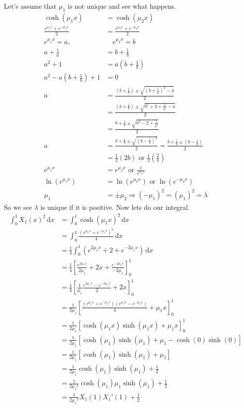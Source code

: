 \documentclass{article}
\begin{document}
Let's assume that $\mu_1$ is not unique and see what happens.
\begin{align*}
  \cosh(\mu_1x)&=\cosh(\mu_2x)\\
  \frac{e^{\mu_1x}+e^{-\mu_1x}}{2}&=\frac{e^{\mu_2x}+e^{-\mu_2x}}{2}\\
  e^{\mu_1x}=a,&\quad e^{\mu_2x}=b\\
  a+\frac{1}{a}&=b+\frac{1}{b}\\
  a^2+1&=a(b+\frac{1}{b})\\
  a^2-a(b+\frac{1}{b})+1&=0\\
  a&=\frac{(b+\frac{1}{b})\pm\sqrt{(b+\frac{1}{b})^2-4}}{2}\\
  &=\frac{(b+\frac{1}{b})\pm\sqrt{b^2+2+\frac{1}{b^2}-4}}{2}\\
  &=\frac{b+\frac{1}{b}\pm\sqrt{b^2-2+\frac{1}{b^2}}}{2}\\
  a&=\frac{b+\frac{1}{b}\pm\sqrt{(b-\frac{1}{b})^2}}{2}=\frac{b+\frac{1}{b}\pm(b-\frac{1}{b})}{2}\\
  &=\frac{1}{2}(2b)\text{ or }\frac{1}{2}\left(\frac{2}{b}\right)\\
  e^{\mu_1x}&=e^{\mu_2x}\text{ or }\frac{1}{e^{\mu_2x}}\\
  \ln(e^{\mu_1x})&=\ln(e^{\mu_2x})\text{ or }\ln(e^{-\mu_2x})\\
  \mu_1&=\pm\mu_2\Rightarrow (-\mu_1)^2=(\mu_1)^2=\lambda
\end{align*}
So we see $\lambda$ is unique if it is positive. Now lets do our integral.
\begin{align*}
  \int_0^1{X_1(x)^2\,\mathrm{d}x}&=\int_0^1{\cosh(\mu_1 x)^2\,\mathrm{d}x}\\
  &=\int_0^1{\frac{(e^{\mu_1x}+e^{-\mu_1x})^2}{4}\,\mathrm{d}x}\\
  &=\frac{1}{4}\int_0^1{(e^{2\mu_1x}+2+e^{-2\mu_1x})\,\mathrm{d}x}\\
  &=\frac{1}{4}\left[\frac{e^{2\mu_1x}}{2\mu_1}+2x+\frac{e^{-2\mu_1x}}{-2\mu_1}\right]_0^1\\
  &=\frac{1}{4}\left[\frac{1}{\mu_1}\frac{e^{2\mu_1x}-e^{-2\mu_1x}}{2}+2x\right]_0^1\\
  &=\frac{1}{2\mu_1}\left[\frac{(e^{\mu_1x}+e^{-\mu_1x})(e^{\mu_1x}-e^{-\mu_1x})}{4}+\mu_1x\right]_0^1\\
  &=\frac{1}{2\mu_1}\left[\cosh(\mu_1x)\sinh(\mu_1x)+\mu_1x\right]_0^1\\
  &=\frac{1}{2\mu_1}\left[\cosh(\mu_1)\sinh(\mu_1)+\mu_1-\cosh(0)\sinh(0)\right]\\
  &=\frac{1}{2\mu_1}\left[\cosh(\mu_1)\sinh(\mu_1)+\mu_1\right]\\
  &=\frac{1}{2\mu_1}\cosh(\mu_1)\sinh(\mu_1)+\frac{1}{2}\\
  &=\frac{1}{2{\mu_1}^2}\cosh(\mu_1)\mu_1\sinh(\mu_1)+\frac{1}{2}\\
  &=\frac{1}{2{\mu_1}^2}X_1(1){X_1}'(1)+\frac{1}{2}\\
\end{align*}
\end{document}

